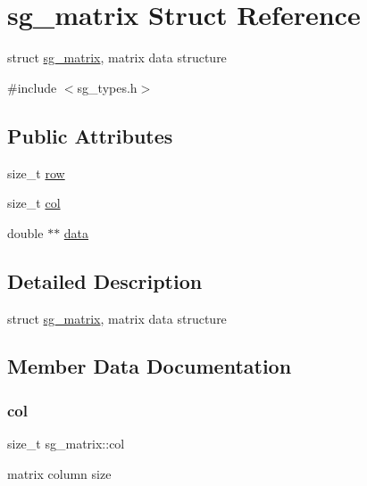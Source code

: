 \hypertarget{structsg__matrix}{}\section{sg\+\_\+matrix Struct Reference}
\label{structsg__matrix}


struct \hyperlink{structsg__matrix}{sg\+\_\+matrix}, matrix data structure  




{\ttfamily \#include $<$sg\+\_\+types.\+h$>$}

\subsection*{Public Attributes}
\begin{DoxyCompactItemize}
\item 
size\+\_\+t \hyperlink{structsg__matrix_a815d3621cbdce7489fbf453286515aa7}{row}
\item 
size\+\_\+t \hyperlink{structsg__matrix_abdb8294059f674358721eb0f0532433e}{col}
\item 
double $\ast$$\ast$ \hyperlink{structsg__matrix_a23034664fe00ccd7f906e99a02b9ac3f}{data}
\end{DoxyCompactItemize}


\subsection{Detailed Description}
struct \hyperlink{structsg__matrix}{sg\+\_\+matrix}, matrix data structure 

\subsection{Member Data Documentation}
\hypertarget{structsg__matrix_abdb8294059f674358721eb0f0532433e}{}\label{structsg__matrix_abdb8294059f674358721eb0f0532433e} 
\subsubsection{\texorpdfstring{col}{col}}
{\footnotesize\ttfamily size\+\_\+t sg\+\_\+matrix\+::col}

matrix column size \hypertarget{structsg__matrix_a23034664fe00ccd7f906e99a02b9ac3f}{}\label{structsg__matrix_a23034664fe00ccd7f906e99a02b9ac3f} 
